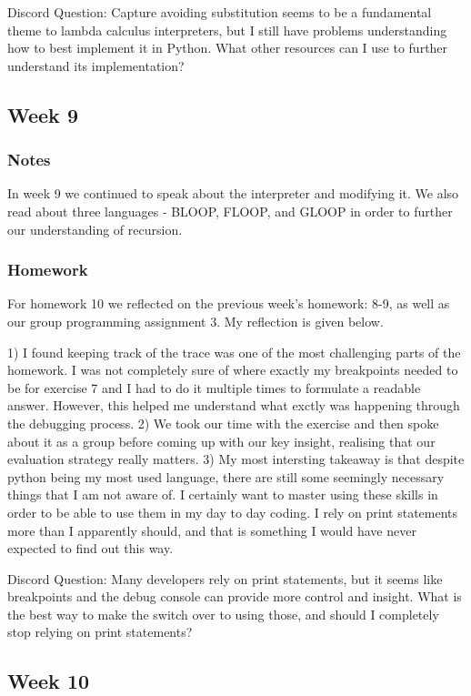 \documentclass{article}
\theoremstyle{theorem}
\theoremstyle{definition}
\theoremstyle{remark}
\begin{document}
Discord Question: Capture avoiding substitution seems to be a fundamental theme to lambda calculus interpreters, but I still have problems understanding how to best implement it in Python. What other resources can I use to further understand its implementation?

\subsection{Week 9}
\subsubsection*{Notes}
In week 9 we continued to speak about the interpreter and modifying it. We also read about three languages - BLOOP, FLOOP, and GLOOP in order to further our understanding of recursion. 

\subsubsection*{Homework}
For homework 10 we reflected on the previous week's homework: 8-9, as well as our group programming assignment 3. My reflection is given below.

1) I found keeping track of the trace was one of the most challenging parts of the homework. I was not completely sure of where exactly my breakpoints needed to be for exercise 7 and I had to do it multiple times to formulate a readable answer. However, this helped me understand what exctly was happening through the debugging process.
2) We took our time with the exercise and then spoke about it as a group before coming up with our key insight, realising that our evaluation strategy really matters.
3) My most intersting takeaway is that despite python being my most used language, there are still some seemingly necessary things that I am not aware of. I certainly want to master using these skills in order to be able to use them in my day to day coding. I rely on print statements more than I apparently should, and that is something I would have never expected to find out this way.

Discord Question: Many developers rely on print statements, but it seems like breakpoints and the debug console can provide more control and insight. What is the best way to make the switch over to using those, and should I completely stop relying on print statements?

\subsection{Week 10}
\end{document}
